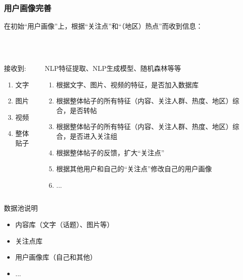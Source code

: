 \documentclass[../Postbot.tex]{subfiles}
\begin{document}
    \begin{frame}
        \frametitle{用户画像完善}
        \centering
        在初始“用户画像”上，根据“关注点”和“（地区）热点”而收到信息：\\
        \hspace*{\fill}\\
        \hspace*{\fill}\\
        \begin{columns}
            \begin{column}{.3\textwidth}
                \centering
                接收到:
                \begin{enumerate}
                    \item 文字
                    \item 图片
                    \item 视频
                    \item 整体贴子
                \end{enumerate}
            \end{column}
            \begin{column}{.7\textwidth}
                NLP特征提取、NLP生成模型、随机森林等等
                \begin{enumerate}
                    \item 根据文字、图片、视频的特征，是否加入数据库 \\
                    \item 根据整体帖子的所有特征（内容、关注人群、热度、地区）综合，是否转帖 \\
                    \item 根据整体帖子的所有特征（内容、关注人群、热度、地区）综合，是否进入关注组 \\
                    \item 根据整体帖子的反馈，扩大“关注点” \\
                    \item 根据其他用户和自己的“关注点”修改自己的用户画像 \\
                    \item ... \\
                \end{enumerate}
            \end{column}
        \end{columns}
    \end{frame}

    \begin{frame}
        数据池说明 \\
        \begin{itemize}
            \item 内容库（文字（话题）、图片等）
            \item 关注点库
            \item 用户画像库（自己和其他）
            \item ...
        \end{itemize}
    \end{frame}
\end{document}
